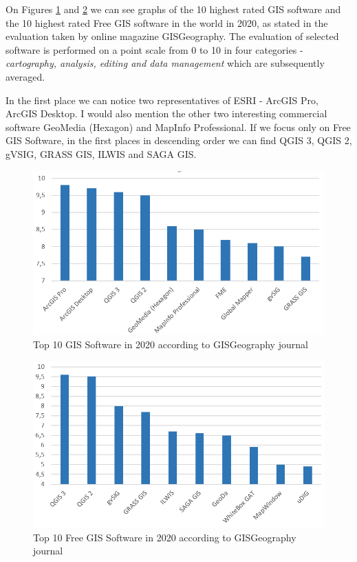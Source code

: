 \documentclass[a4paper,10pt,twoside]{article}
\begin{document}
\noindent On Figures \ref{fig:hodnoceni_all} and  \ref{fig:hodnoceni_free} we can see graphs of the 10 highest rated GIS software and the 10 highest rated Free GIS software in the world in 2020, as stated in the evaluation taken by online magazine GISGeography. The evaluation of selected software is performed on a point scale from 0 to 10 in four categories - \textit{cartography, analysis, editing and data management} which are subsequently averaged. 

In the first place we can notice two representatives of ESRI - ArcGIS Pro, ArcGIS Desktop. I would also mention the other two interesting commercial software GeoMedia (Hexagon) and MapInfo Professional. If we focus only on Free GIS Software, in the first places in descending order we can find QGIS 3, QGIS 2, gVSIG, GRASS GIS, ILWIS and SAGA GIS. 

\vspace{0.3cm}
\begin{figure}[hbt!] 
\begin{center}
\includegraphics[width=13cm]{../pictures/hodnoceni_all.png} 
\caption[Top 10 GIS Software in 2020 according to GISGeography journal]{Top 10 GIS Software in 2020 according to GISGeography journal}
\label{fig:hodnoceni_all}
\end{center}
\end{figure}

\begin{figure}[hbt!] 
\begin{center}
\includegraphics[width=13cm]{../pictures/hodnoceni_free.png} 
\caption[Top 10 Free GIS Software in 2020 according to GISGeography journal]{Top 10 Free GIS Software in 2020 according to GISGeography journal}
\label{fig:hodnoceni_free}
\end{center}
\end{figure}
\end{document}
